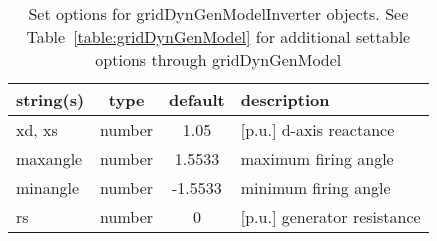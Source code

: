 \begin{table}[ht]
\centering
\begin{tabular}{p{5cm} c c p{7cm}}
\hline
string(s) & type & default & description \\
\hline
xd, xs & number & 1.05 & [p.u.] d-axis reactance\\
maxangle & number & 1.5533 & maximum firing angle\\
minangle & number & -1.5533 & minimum firing angle\\
rs & number & 0 & [p.u.] generator resistance\\
\hline
\end{tabular}
\caption{Set options for gridDynGenModelInverter objects. See Table~\ref{table:gridDynGenModel} for additional settable options through gridDynGenModel}
\label{table:gridDynGenModelInverter}
\end{table}
